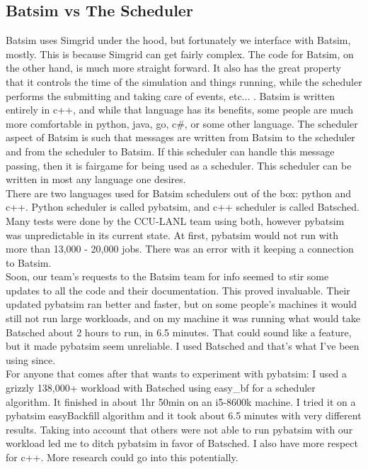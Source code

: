 \documentclass[titlepage]{article}
\newenvironment{regular}{\color{black}}{}
\begin{document}
\subsection{Batsim vs The Scheduler}
\begin{regular}
Batsim uses Simgrid under the hood, but fortunately we interface with Batsim, mostly.  This is because Simgrid can get
fairly complex.  The code for Batsim, on the other hand, is much more straight forward.  It also has the great property
that it controls the time of the simulation and things running, while the scheduler performs the submitting and taking
care of events, etc...  .  Batsim is written entirely in c++, and while that language has its benefits, some people are
much more comfortable in python, java, go, c\#, or some other language.  The scheduler aspect of Batsim is such that
messages are written from Batsim to the scheduler and from the scheduler to Batsim.  If this scheduler can handle this
message passing, then it is fairgame for being used as a scheduler.  This scheduler can be written in most any language one
desires.\\

There are two languages used for Batsim schedulers out of the box: python and c++.  Python scheduler is called pybatsim, and
c++ scheduler is called Batsched.  Many tests were done by the CCU-LANL team using both, however pybatsim was unpredictable in its current state.
At first, pybatsim would not run with more than 13,000 - 20,000 jobs.  There was an error with it keeping a connection to Batsim.\\

Soon, our team's requests to the Batsim team for info seemed to stir some updates to all the code and their documentation.  This proved
invaluable.  Their updated pybatsim ran better and faster, but on some people's machines it would still not run
large workloads, and on my machine it was running what would take Batsched about 2 hours to run, in 6.5 minutes.  That could
sound like a feature, but it made pybatsim seem unreliable.  I used Batsched and that's what I've been using since.\\

For anyone that comes after that wants to experiment with pybatsim:  I used a grizzly 138,000+ workload with Batsched using
easy\_bf for a scheduler algorithm.  It finished in about 1hr 50min on an i5-8600k machine.  I tried it on a pybatsim easyBackfill
algorithm and it took about 6.5 minutes with very different results.  Taking into account that others were not able to run
pybatsim with our workload led me to ditch pybatsim in favor of Batsched.  I also have more respect for c++.  More research could go into this
potentially.\\


\end{regular}
\end{document}
